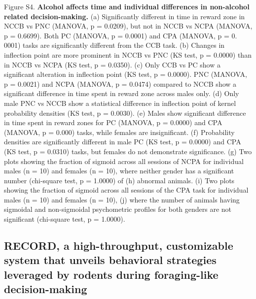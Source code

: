 \documentclass{article}
\newcounter{suppfig}
\begin{document}
\begin{singlespace}
\noindent Figure S4. \textbf{Alcohol affects time and individual differences in non-alcohol related decision-making.} (a) Significantly different in time in reward zone in NCCB vs PNC (MANOVA, p = 0.0209), but not in NCCB vs NCPA (MANOVA, p = 0.6699). Both PC (MANOVA, p = 0.0001) and CPA (MANOVA, p = 0. 0001) tasks are significantly different from the CCB task. (b) Changes in inflection point are more prominent in NCCB vs PNC (KS test, p = 0.0000) than in NCCB vs NCPA (KS test, p = 0.0350). (c) Only CCB vs PC show a significant alteration in inflection point (KS test, p = 0.0000). PNC (MANOVA, p = 0.0021) and NCPA (MANOVA, p = 0.0474) compared to NCCB show a significant difference in time spent in reward zone across males only. (d) Only male PNC vs NCCB show a statistical difference in inflection point of kernel probability densities (KS test, p = 0.0030). (e) Males show significant difference in time spent in reward zones for PC (MANOVA, p = 0.0000) and CPA (MANOVA, p = 0.000) tasks, while females are insignificant. (f) Probability densities are significantly different in male PC (KS test, p = 0.0000) and CPA (KS test, p = 0.0310) tasks, but females do not demonstrate significance. (g) Two plots showing the fraction of sigmoid across all sessions of NCPA for individual males (n = 10) and females (n = 10), where neither gender has a significant number (chi-square test, p = 1.0000) of (h) abnormal animals. (i) Two plots showing the fraction of sigmoid across all sessions of the CPA task for individual males (n = 10) and females (n = 10), (j) where the number of animals having sigmoidal and non-sigmoidal psychometric profiles for both genders are not significant (chi-square test, p = 1.0000).
\end{singlespace}

\clearpage






\subsection{RECORD, a high-throughput, customizable system that unveils behavioral strategies leveraged by rodents during foraging-like decision-making}

\setcounter{figure}{0}
\setcounter{suppfig}{0}
\end{document}
